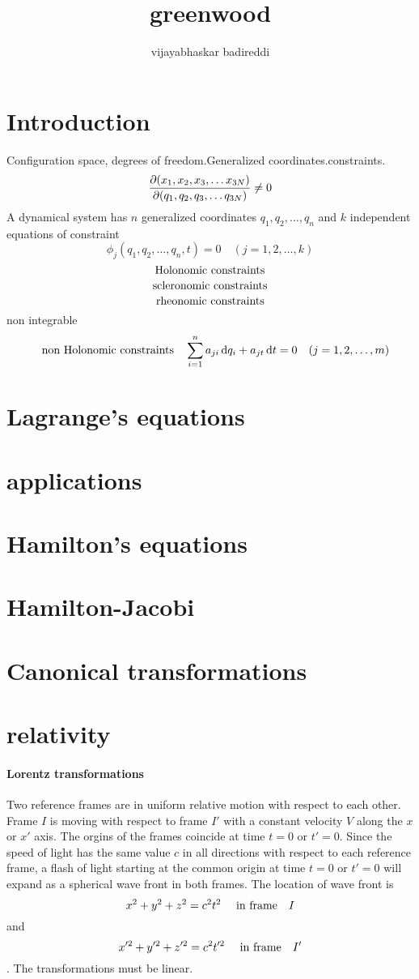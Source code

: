 \documentclass[12pt]{article}
\title{greenwood}
\author{vijayabhaskar badireddi}
\begin{document}

\section*{Introduction}
Configuration space,
degrees of freedom.Generalized coordinates.constraints.
\[\pdv{(x_1,x_2,x_3,\ldots x_{3N})}{(q_1,q_2,q_3,\ldots q_{3N})}\neq 0\]
A dynamical system has $n$ generalized coordinates $q_1,q_2,\ldots,q_n$ and $k$ independent equations of constraint \[\phi_j(q_1,q_2,\ldots,q_n,t)=0\quad(j=1,2,\ldots,k)\]
\[\qq{Holonomic constraints}\]
\[\qq{scleronomic constraints}\]
\[\qq{rheonomic constraints}\]
non integrable 
\[\qq{non Holonomic constraints}\sum_{i=1}^{n}a_{ji}\dd{q_i}+a_{jt}\dd{t}=0\quad(j=1,2,\ldots,m)\]
\section*{Lagrange's equations}
\section*{applications}
\section*{Hamilton's equations}
\section*{Hamilton-Jacobi}
\section*{Canonical transformations}
\section*{relativity}
\paragraph{Lorentz transformations}
Two reference frames are in uniform relative motion with respect to each other. Frame $I$ is moving with respect to frame $I'$ with a constant velocity $V$ along the $x$ or $x'$ axis. The orgins of the frames coincide at time $t=0$ or $t'=0$. Since the speed of light has the same value $c$ in all directions with respect to each reference frame, a flash of light starting at the common origin at time $t=0$ or $t'=0$ will expand as a spherical wave front in both frames. The location of wave front is \[x^2+y^2+z^2=c^2t^2\qq{ in frame} I \] and \[ x'^2+y'^2+z'^2=c^2t'^2\qq{ in frame} I'\].
The transformations must be linear.
\end{document}
